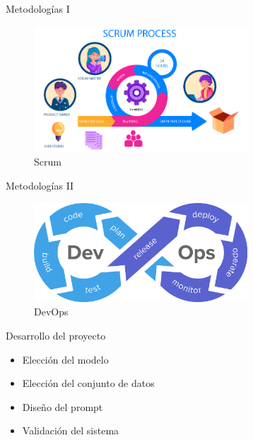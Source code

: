 \documentclass[aspectratio=169,xcolor=dvipsnames, t]{beamer}
\begin{document}

\begin{frame}{Metodologías I}
        \begin{figure}
            \includegraphics[width=8cm]{style_data/img/scrum-methodology.png}        
            \caption{Scrum}
            \label{fig:subim1}
        \end{figure}
\end{frame}

\begin{frame}{Metodologías II}
    
    \begin{figure}
        \includegraphics[width=8cm]{style_data/img/dev-ops.png}        
        \caption{DevOps}
        \label{fig:subim2}
    \end{figure}
    
\end{frame}

\begin{frame}{Desarrollo del proyecto}
    \begin{itemize}
        \item Elección del modelo
        \item Elección del conjunto de datos
        \item Diseño del prompt
        \item Validación del sistema
    \end{itemize}
\end{frame}
\end{document}
